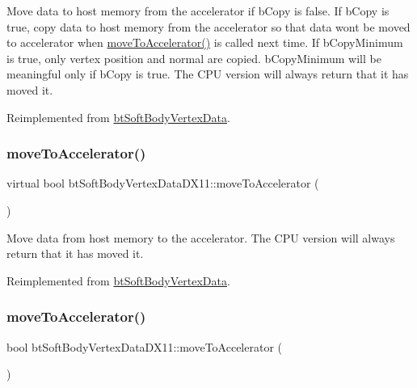 Move data to host memory from the accelerator if b\+Copy is false. If b\+Copy is true, copy data to host memory from the accelerator so that data won\textquotesingle{}t be moved to accelerator when \hyperlink{classbtSoftBodyVertexDataDX11_ac12f0c144bc116e3a0e4c11fc0e55365}{move\+To\+Accelerator()} is called next time. If b\+Copy\+Minimum is true, only vertex position and normal are copied. b\+Copy\+Minimum will be meaningful only if b\+Copy is true. The C\+PU version will always return that it has moved it. 

Reimplemented from \hyperlink{classbtSoftBodyVertexData_aaa8ab4065ecf47a9c3b946b67b6c9f1b}{bt\+Soft\+Body\+Vertex\+Data}.

\mbox{\label{classbtSoftBodyVertexDataDX11_aa68255e1508006f34dedf58855e9db4f}} 
\subsubsection{\texorpdfstring{move\+To\+Accelerator()}{moveToAccelerator()}\hspace{0.1cm}{\footnotesize\ttfamily [1/2]}}
{\footnotesize\ttfamily virtual bool bt\+Soft\+Body\+Vertex\+Data\+D\+X11\+::move\+To\+Accelerator (\begin{DoxyParamCaption}{ }\end{DoxyParamCaption})\hspace{0.3cm}{\ttfamily [virtual]}}

Move data from host memory to the accelerator. The C\+PU version will always return that it has moved it. 

Reimplemented from \hyperlink{classbtSoftBodyVertexData_a2d3f04a5b2461bf95beca6f3fc48e28b}{bt\+Soft\+Body\+Vertex\+Data}.

\mbox{\label{classbtSoftBodyVertexDataDX11_ac12f0c144bc116e3a0e4c11fc0e55365}} 
\subsubsection{\texorpdfstring{move\+To\+Accelerator()}{moveToAccelerator()}\hspace{0.1cm}{\footnotesize\ttfamily [2/2]}}
{\footnotesize\ttfamily bool bt\+Soft\+Body\+Vertex\+Data\+D\+X11\+::move\+To\+Accelerator (\begin{DoxyParamCaption}{ }\end{DoxyParamCaption})\hspace{0.3cm}{\ttfamily [virtual]}}

